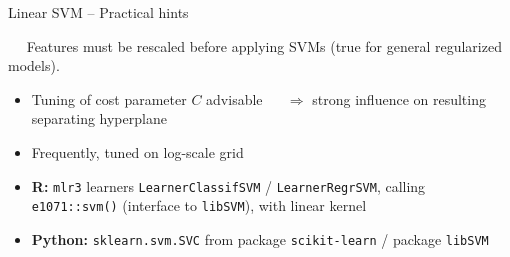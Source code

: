 \undraft


\begin{frame}{Linear SVM -- Practical hints}

\footnotesize

 ~~
Features must be rescaled before applying SVMs (true for general regularized 
models).

\medskip


\begin{itemize}
  \item Tuning of cost parameter $C$ advisable ~~ $\Rightarrow$ strong influence 
  on resulting separating hyperplane
  \item Frequently, tuned on log-scale grid
\end{itemize}

\medskip

\begin{itemize}
  \item \textbf{R:} \texttt{mlr3} learners \texttt{LearnerClassifSVM} /
  \texttt{LearnerRegrSVM}, calling \texttt{e1071::svm()} (interface to 
  \texttt{libSVM}), with linear kernel
  \item \textbf{Python:} \texttt{sklearn.svm.SVC} from package 
  \texttt{scikit-learn} / package \texttt{libSVM}
\end{itemize}

\end{frame}
